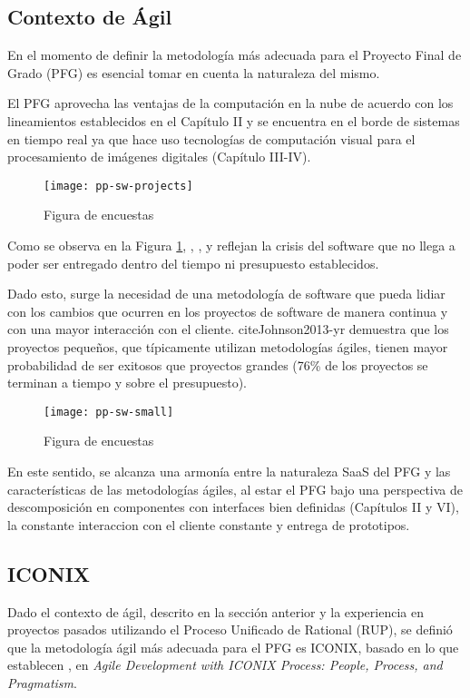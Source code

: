 \subsection{Contexto de Ágil}
En el momento de definir la metodología más adecuada para el Proyecto Final de Grado (PFG) es esencial tomar en cuenta la naturaleza del mismo.

El PFG aprovecha las ventajas de la computación en la nube de acuerdo con los lineamientos establecidos en el Capítulo II y se encuentra en el borde de sistemas en tiempo real ya que hace uso tecnologías de computación visual para el procesamiento de imágenes digitales (Capítulo III-IV). 

    \begin{figure}[H]
        \centering
        \texttt{[image: pp-sw-projects]}
        \caption{Figura de encuestas \protect\cite{Fox2013-ct}}
        \label{fig:pp-sw-projects}
    \end{figure}

Como se observa en la Figura \ref{fig:pp-sw-projects}, , ,  y  reflejan la crisis del software que no llega a poder ser entregado dentro del tiempo ni presupuesto establecidos. 

Dado esto, surge la necesidad de una metodología de software que pueda lidiar con los cambios que ocurren en los proyectos de software de manera continua y con una mayor interacción con el cliente. cite{Johnson2013-yr} demuestra que los proyectos pequeños, que típicamente utilizan metodologías ágiles, tienen mayor probabilidad de ser exitosos que proyectos grandes (76\% de los proyectos se terminan a tiempo y sobre el presupuesto). 
    
    \begin{figure}[H]
            \centering
            \texttt{[image: pp-sw-small]}
            \caption{Figura de encuestas \protect\cite{Fox2013-ct}}
            \label{fig:pp-sw-small}
        \end{figure}

En este sentido, se alcanza una armonía entre la naturaleza SaaS del PFG y las características de las metodologías ágiles, al estar el PFG  bajo una perspectiva de descomposición en componentes con interfaces bien definidas (Capítulos II y VI), la constante interaccion con el cliente constante y entrega de prototipos.

\subsection{ICONIX}
Dado el contexto de ágil, descrito en la sección anterior y la experiencia en proyectos pasados utilizando el Proceso Unificado de Rational (RUP), se definió que la metodología ágil más adecuada para el PFG es ICONIX, basado en lo que establecen , en \textit{Agile Development with ICONIX Process: People, Process, and Pragmatism}. 

